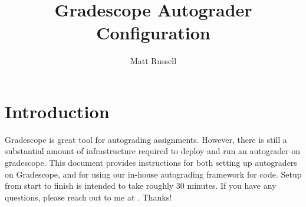 \documentclass[11pt]{report}
\author{Matt Russell}
\title{Gradescope Autograder Configuration}
\begin{document}
\maketitle

\chapter*{Introduction}
Gradescope is great tool for autograding assignments. However, there is still a substantial amount
of infrastructure required to deploy and run an autograder on gradescope. This document provides 
instructions for both setting up autograders on Gradescope, and for using our in-house autograding
framework for  code. Setup from start to finish is intended to take roughly 30 minutes.
If you have any questions, please reach out to me at . Thanks!
\end{document}
